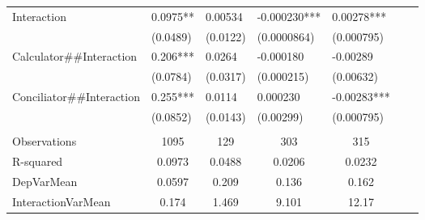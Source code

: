 \begin{tabular}{rrrrrrr}
\multicolumn{1}{l}{Interaction} & \multicolumn{1}{l}{0.0975**} & \multicolumn{1}{l}{0.00534} & \multicolumn{1}{l}{-0.000230***} & \multicolumn{1}{l}{0.00278***} & \multicolumn{1}{l}{} & \multicolumn{1}{l}{} \\
\multicolumn{1}{l}{} & \multicolumn{1}{l}{(0.0489)} & \multicolumn{1}{l}{(0.0122)} & \multicolumn{1}{l}{(0.0000864)} & \multicolumn{1}{l}{(0.000795)} & \multicolumn{1}{l}{} & \multicolumn{1}{l}{} \\
\multicolumn{1}{l}{Calculator\#\#Interaction} & \multicolumn{1}{l}{0.206***} & \multicolumn{1}{l}{0.0264} & \multicolumn{1}{l}{-0.000180} & \multicolumn{1}{l}{-0.00289} & \multicolumn{1}{l}{} & \multicolumn{1}{l}{} \\
\multicolumn{1}{l}{} & \multicolumn{1}{l}{(0.0784)} & \multicolumn{1}{l}{(0.0317)} & \multicolumn{1}{l}{(0.000215)} & \multicolumn{1}{l}{(0.00632)} & \multicolumn{1}{l}{} & \multicolumn{1}{l}{} \\
\multicolumn{1}{l}{Conciliator\#\#Interaction} & \multicolumn{1}{l}{0.255***} & \multicolumn{1}{l}{0.0114} & \multicolumn{1}{l}{0.000230} & \multicolumn{1}{l}{-0.00283***} & \multicolumn{1}{l}{} & \multicolumn{1}{l}{} \\
\multicolumn{1}{l}{} & \multicolumn{1}{l}{(0.0852)} & \multicolumn{1}{l}{(0.0143)} & \multicolumn{1}{l}{(0.00299)} & \multicolumn{1}{l}{(0.000795)} & \multicolumn{1}{l}{} & \multicolumn{1}{l}{} \\
\multicolumn{1}{l}{} & \multicolumn{1}{l}{} & \multicolumn{1}{l}{} & \multicolumn{1}{l}{} & \multicolumn{1}{l}{} & \multicolumn{1}{l}{} &  \\
\midrule
\multicolumn{1}{l}{Observations} & \multicolumn{1}{c}{1095} & \multicolumn{1}{c}{129} & \multicolumn{1}{c}{303} & \multicolumn{1}{c}{315} & \multicolumn{1}{c}{} & \multicolumn{1}{c}{} \\
\multicolumn{1}{l}{R-squared} & \multicolumn{1}{c}{0.0973} & \multicolumn{1}{c}{0.0488} & \multicolumn{1}{c}{0.0206} & \multicolumn{1}{c}{0.0232} & \multicolumn{1}{c}{} & \multicolumn{1}{c}{} \\
\multicolumn{1}{l}{DepVarMean} & \multicolumn{1}{c}{0.0597} & \multicolumn{1}{c}{0.209} & \multicolumn{1}{c}{0.136} & \multicolumn{1}{c}{0.162} & \multicolumn{1}{c}{} & \multicolumn{1}{c}{} \\
\multicolumn{1}{l}{InteractionVarMean} & \multicolumn{1}{c}{0.174} & \multicolumn{1}{c}{1.469} & \multicolumn{1}{c}{9.101} & \multicolumn{1}{c}{12.17} & \multicolumn{1}{c}{} & \multicolumn{1}{c}{} \\

\end{tabular}
